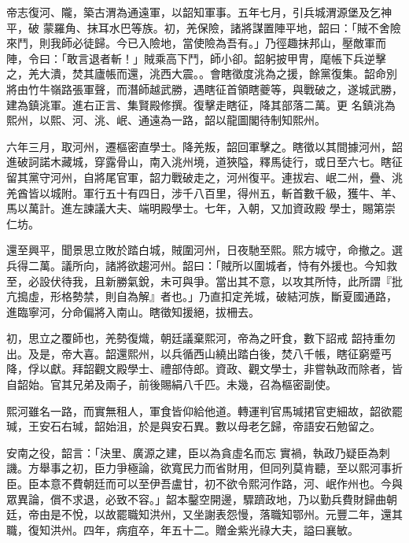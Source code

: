 \begin{pinyinscope}
 帝志復河、隴，築古渭為通遠軍，以韶知軍事。五年七月，引兵城渭源堡及乞神平，破
 蒙羅角、抹耳水巴等族。初，羌保險，諸將謀置陣平地，韶曰：「賊不舍險來鬥，則我師必徒歸。今已入險地，當使險為吾有。」乃徑趣抹邦山，壓敵軍而陣，令曰：「敢言退者斬！」賊乘高下鬥，師小卻。韶躬披甲冑，麾帳下兵逆擊之，羌大潰，焚其廬帳而還，洮西大震。。會瞎徵度洮為之援，餘黨復集。韶命別將由竹牛嶺路張軍聲，而潛師越武勝，遇瞎征首領瞎夔等，與戰破之，遂城武勝，建為鎮洮軍。進右正言、集賢殿修撰。復擊走瞎征，降其部落二萬。更
 名鎮洮為熙州，以熙、河、洮、岷、通遠為一路，韶以龍圖閣待制知熙州。



 六年三月，取河州，遷樞密直學士。降羌叛，韶回軍擊之。瞎徵以其間據河州，韶進破訶諾木藏城，穿露骨山，南入洮州境，道狹隘，釋馬徒行，或日至六七。瞎征留其黨守河州，自將尾官軍，韶力戰破走之，河州復平。連拔宕、岷二州，疊、洮羌酋皆以城附。軍行五十有四日，涉千八百里，得州五，斬首數千級，獲牛、羊、馬以萬計。進左諫議大夫、端明殿學士。七年，入朝，又加資政殿
 學士，賜第崇仁坊。



 還至興平，聞景思立敗於踏白城，賊圍河州，日夜馳至熙。熙方城守，命撤之。選兵得二萬。議所向，諸將欲趨河州。韶曰：「賊所以圍城者，恃有外援也。今知救至，必設伏待我，且新勝氣銳，未可與爭。當出其不意，以攻其所恃，此所謂『批亢搗虛，形格勢禁，則自為解』者也。」乃直扣定羌城，破結河族，斷夏國通路，進臨寧河，分命偏將入南山。瞎徵知援絕，拔柵去。



 初，思立之覆師也，羌勢復熾，朝廷議棄熙河，帝為之旰食，數下詔戒
 韶持重勿出。及是，帝大喜。韶還熙州，以兵循西山繞出踏白後，焚八千帳，瞎征窮蹙丐降，俘以獻。拜韶觀文殿學士、禮部侍郎。資政、觀文學士，非嘗執政而除者，皆自韶始。官其兄弟及兩子，前後賜絹八千匹。未幾，召為樞密副使。



 熙河雖名一路，而實無租人，軍食皆仰給他道。轉運判官馬瑊捃官吏細故，韶欲罷瑊，王安石右瑊，韶始沮，於是與安石異。數以母老乞歸，帝語安石勉留之。



 安南之役，韶言：「決里、廣源之建，臣以為貪虛名而忘
 實禍，執政乃疑臣為刺譏。方舉事之初，臣力爭極論，欲寬民力而省財用，但同列莫肯聽，至以熙河事折臣。臣本意不費朝廷而可以至伊吾盧甘，初不欲令熙河作路，河、岷作州也。今與眾異論，償不求退，必致不容。」韶本鑿空開邊，驟躋政地，乃以勤兵費財歸曲朝廷，帝由是不悅，以故罷職知洪州，又坐謝表怨慢，落職知鄂州。元豐二年，還其職，復知洪州。四年，病疽卒，年五十二。贈金紫光祿大夫，謚曰襄敏。




\end{pinyinscope}
